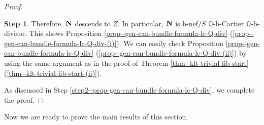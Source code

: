 \documentclass[12pt]{amsart}
\theoremstyle{definition}
\newtheorem{step2}{Step}
\begin{document}
\begin{proof}
\begin{step2}
Therefore, $\boldsymbol{\rm N}$ descends to $\overline{Z}$. 
In particular, $\boldsymbol{\rm N}$ is b-nef$/S$ $\mathbb{Q}$-b-Cartier $\mathbb{Q}$-b-divisor. 
This shows Proposition \ref{prop--gen-can-bundle-formula-lc-Q-div} (\ref{prop--gen-can-bundle-formula-lc-Q-div-(i)}). 
We can easily check Proposition \ref{prop--gen-can-bundle-formula-lc-Q-div} (\ref{prop--gen-can-bundle-formula-lc-Q-div-(ii)}) by using the same argument as in the proof of Theorem \ref{thm--klt-trivial-fib-start} (\ref{thm--klt-trivial-fib-start-(ii)}). 
\end{step2}
As discussed in Step \ref{step2--prop-gen-can-bundle-formula-lc-Q-div}, we complete the proof. 
\end{proof}


Now we are ready to prove the main results of this section. 
\end{document}

